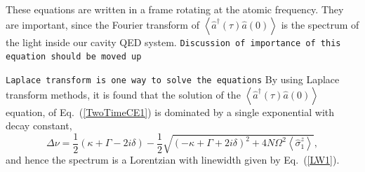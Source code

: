 \documentclass[aps,prl,twocolumn,
superscriptaddress,groupedaddress]{revtex4}
\newcommand{\dmcomment}[1]{{\tt #1}}
\begin{document}
These equations are written in a frame rotating at the atomic frequency.
They are important, since the Fourier transform of
$\left<\hat{a}^{\dagger}(\tau)\hat{a}(0)\right>$ is the spectrum of the
light inside our cavity QED system.  \dmcomment{Discussion of importance
of this equation should be moved up}


\dmcomment{Laplace transform is one way to solve the equations} By using
Laplace transform methods, it is found that the solution of the
$\left<\hat{a}^{\dagger}(\tau)\hat{a}(0)\right>$ equation, of
Eq.~(\ref{TwoTimeCE1}) is dominated by a single exponential with decay
constant,
\begin{equation}
\Delta \nu = \frac{1}{2}(\kappa+\Gamma-2i\delta) -
\frac{1}{2} \sqrt{(-\kappa+\Gamma+2i\delta)^2 +
4N\Omega^2 \left<\hat{\sigma}_{1}^{z}\right>},
\label{LW1}
\end{equation}
and hence the spectrum is a Lorentzian with linewidth given by
Eq.~(\ref{LW1}).

\end{document}
